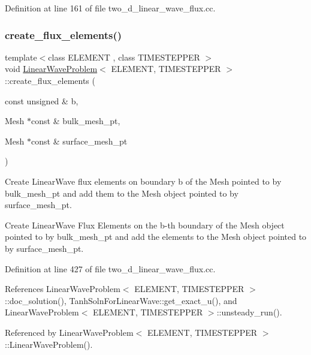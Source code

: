 Definition at line 161 of file two\+\_\+d\+\_\+linear\+\_\+wave\+\_\+flux.\+cc.

\mbox{\label{classLinearWaveProblem_a2ea8935076615413cc864e127345b1c0}} 
\subsubsection{\texorpdfstring{create\+\_\+flux\+\_\+elements()}{create\_flux\_elements()}}
{\footnotesize\ttfamily template$<$class E\+L\+E\+M\+E\+NT , class T\+I\+M\+E\+S\+T\+E\+P\+P\+ER $>$ \\
void \hyperlink{classLinearWaveProblem}{Linear\+Wave\+Problem}$<$ E\+L\+E\+M\+E\+NT, T\+I\+M\+E\+S\+T\+E\+P\+P\+ER $>$\+::create\+\_\+flux\+\_\+elements (\begin{DoxyParamCaption}\item[{const unsigned \&}]{b,  }\item[{Mesh $\ast$const \&}]{bulk\+\_\+mesh\+\_\+pt,  }\item[{Mesh $\ast$const \&}]{surface\+\_\+mesh\+\_\+pt }\end{DoxyParamCaption})\hspace{0.3cm}{\ttfamily [private]}}



Create Linear\+Wave flux elements on boundary b of the Mesh pointed to by bulk\+\_\+mesh\+\_\+pt and add them to the Mesh object pointed to by surface\+\_\+mesh\+\_\+pt. 

Create Linear\+Wave Flux Elements on the b-\/th boundary of the Mesh object pointed to by bulk\+\_\+mesh\+\_\+pt and add the elements to the Mesh object pointed to by surface\+\_\+mesh\+\_\+pt. 

Definition at line 427 of file two\+\_\+d\+\_\+linear\+\_\+wave\+\_\+flux.\+cc.



References Linear\+Wave\+Problem$<$ E\+L\+E\+M\+E\+N\+T, T\+I\+M\+E\+S\+T\+E\+P\+P\+E\+R $>$\+::doc\+\_\+solution(), Tanh\+Soln\+For\+Linear\+Wave\+::get\+\_\+exact\+\_\+u(), and Linear\+Wave\+Problem$<$ E\+L\+E\+M\+E\+N\+T, T\+I\+M\+E\+S\+T\+E\+P\+P\+E\+R $>$\+::unsteady\+\_\+run().



Referenced by Linear\+Wave\+Problem$<$ E\+L\+E\+M\+E\+N\+T, T\+I\+M\+E\+S\+T\+E\+P\+P\+E\+R $>$\+::\+Linear\+Wave\+Problem().

